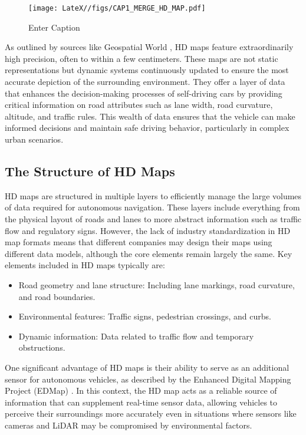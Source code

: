 \begin{figure}
    \centering
    \texttt{[image: LateX//figs/CAP1\_MERGE\_HD\_MAP.pdf]}
    \caption{Enter Caption}
    \label{fig:enter-label}
\end{figure}

As outlined by sources like Geospatial World \cite{geospatialworld_hd_maps}, HD maps feature extraordinarily high precision, often to within a few centimeters. These maps are not static representations but dynamic systems continuously updated to ensure the most accurate depiction of the surrounding environment. They offer a layer of data that enhances the decision-making processes of self-driving cars by providing critical information on road attributes such as lane width, road curvature, altitude, and traffic rules. This wealth of data ensures that the vehicle can make informed decisions and maintain safe driving behavior, particularly in complex urban scenarios.

\subsection{The Structure of HD Maps}
HD maps are structured in multiple layers to efficiently manage the large volumes of data required for autonomous navigation. These layers include everything from the physical layout of roads and lanes to more abstract information such as traffic flow and regulatory signs. However, the lack of industry standardization in HD map formats means that different companies may design their maps using different data models, although the core elements remain largely the same.
Key elements included in HD maps typically are:

\begin{itemize}
    \item Road geometry and lane structure: Including lane markings, road curvature, and road boundaries.
    \item Environmental features: Traffic signs, pedestrian crossings, and curbs.
    \item Dynamic information: Data related to traffic flow and temporary obstructions.
\end{itemize}

One significant advantage of HD maps is their ability to serve as an additional sensor for autonomous vehicles, as described by the Enhanced Digital Mapping Project (EDMap) \cite{edmap_2004} . In this context, the HD map acts as a reliable source of information that can supplement real-time sensor data, allowing vehicles to perceive their surroundings more accurately even in situations where sensors like cameras and LiDAR may be compromised by environmental factors.


